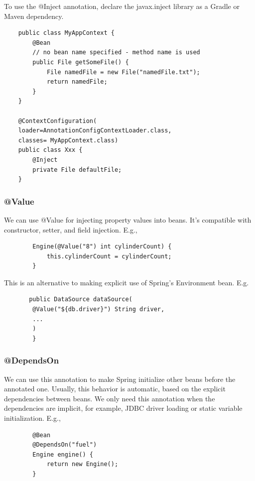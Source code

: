\documentclass{scrartcl}
\begin{document}
To use the @Inject annotation, declare the javax.inject library as a Gradle or Maven dependency.

\begin{lstlisting}
    public class MyAppContext {
        @Bean
        // no bean name specified - method name is used
        public File getSomeFile() {
            File namedFile = new File("namedFile.txt");
            return namedFile;
        }
    }

    @ContextConfiguration(
    loader=AnnotationConfigContextLoader.class,
    classes= MyAppContext.class)
    public class Xxx {
        @Inject
        private File defaultFile;
    }
\end{lstlisting}

\subsubsection{@Value}

    We can use @Value for injecting property values into beans. It’s compatible with constructor, setter, and field injection. E.g.,

    \begin{lstlisting}
        Engine(@Value("8") int cylinderCount) {
            this.cylinderCount = cylinderCount;
        }
    \end{lstlisting}

    This is an alternative to making explicit use of Spring's Environment bean. E.g.

    \begin{lstlisting}
       public DataSource dataSource(
        @Value("${db.driver}") String driver,
        ...
        )
        }
    \end{lstlisting}

\subsubsection{@DependsOn}

    We can use this annotation to make Spring initialize other beans before the annotated one. Usually, this behavior is automatic, based on the explicit dependencies between beans. We only need this annotation when the dependencies are implicit, for example, JDBC driver loading or static variable initialization. E.g.,

     \begin{lstlisting}
        @Bean
        @DependsOn("fuel")
        Engine engine() {
            return new Engine();
        }
    \end{lstlisting}
\end{document}

